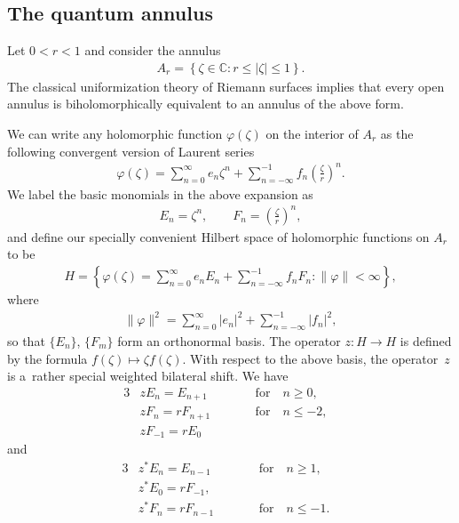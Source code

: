 \documentclass[pdftex]{sigma}
\numberwithin{equation}{section}
\begin{document}
\subsection{The quantum annulus}

Let $0<r<1$ and consider the annulus
\begin{gather*}
A_{r}= \left\{\zeta\in{\mathbb C}: r \leq |\zeta| \leq 1\right\}.
\end{gather*}
The classical uniformization theory of Riemann surfaces implies that every open annulus is biholomorphically equivalent
to an annulus of the above form.

We can write any holomorphic function $\varphi(\zeta)$ on the interior of $A_{r}$ as the following convergent version of
Laurent series
\begin{gather*}
\varphi(\zeta)=\sum\limits_{n=0}^\infty e_n\zeta^n+\sum\limits_{n=-\infty}^{-1} f_n\left(\frac{\zeta}{r}\right)^n.
\end{gather*}
We label the basic monomials in the above expansion as
\begin{gather*}
E_n=\zeta^n,
\qquad
F_n =\left(\frac{\zeta}{r}\right)^n,
\end{gather*}
and def\/ine our specially convenient Hilbert space of holomorphic functions on $A_{r}$ to be
\begin{gather*}
H=\left\{\varphi(\zeta)=\sum\limits_{n=0}^\infty e_nE_n+\sum\limits_{n=-\infty}^{-1}f_nF_n:
\|\varphi\|<\infty\right\},
\end{gather*}
where
\begin{gather*}
\|\varphi\|^2=\sum\limits_{n=0}^\infty |e_n|^2+\sum\limits_{n=-\infty}^{-1}|f_n|^2,
\end{gather*}
so that $\{E_n\}$, $\{F_m\}$ form an orthonormal basis.
The operator $z:H \to H$ is def\/ined by the formula $f(\zeta)\mapsto \zeta f(\zeta)$.
With respect to the above basis, the operator~$z$ is a~rather special weighted bilateral shift.
We have
\begin{alignat*}{3}
& zE_n=E_{n+1} \qquad && \text{for} \quad n\ge 0, &
\\
& zF_n=rF_{n+1} \qquad && \text{for} \quad  n\le -2, &
\\
 & zF_{-1}=rE_0&&&
\end{alignat*}
and
\begin{alignat*}{3}
&  z^*E_n=E_{n-1} \qquad && \text{for} \quad n\ge 1,&
\\
& z^*E_0=rF_{-1},&&&
\\
 & z^*F_n=rF_{n-1} \qquad && \text{for} \quad n\le -1.&
\end{alignat*}
\end{document}
